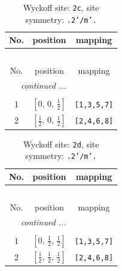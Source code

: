 \documentclass[fleqn,8pt]{jsarticle}
\begin{document}
\begin{longtable}{ccc}
\caption{Wyckoff site: {\tt 2c}, site symmetry: {\tt .2'/m'.}}
 \\
 \hline \hline
No. & position & mapping \\ \hline \endfirsthead

\multicolumn{2}{l}{\tablename\ \thetable{}} \\
 \hline \hline
No. & position & mapping \\ \hline \endhead

 \hline \hline
\multicolumn{2}{r}{\footnotesize\it continued ...} \\ \endfoot

 \hline \hline
\multicolumn{2}{r}{} \\ \endlastfoot

1 & $\left[ 0,\, 0,\, \frac{1}{2} \right]$ & {\tt [1,3,5,7]} \\ \hline
2 & $\left[ \frac{1}{2},\, 0,\, \frac{1}{2} \right]$ & {\tt [2,4,6,8]} \\
\end{longtable}
\renewcommand{\arraystretch}{1.2}
\begin{longtable}{ccc}
\caption{Wyckoff site: {\tt 2d}, site symmetry: {\tt .2'/m'.}}
 \\
 \hline \hline
No. & position & mapping \\ \hline \endfirsthead

\multicolumn{2}{l}{\tablename\ \thetable{}} \\
 \hline \hline
No. & position & mapping \\ \hline \endhead

 \hline \hline
\multicolumn{2}{r}{\footnotesize\it continued ...} \\ \endfoot

 \hline \hline
\multicolumn{2}{r}{} \\ \endlastfoot

1 & $\left[ 0,\, \frac{1}{2},\, \frac{1}{2} \right]$ & {\tt [1,3,5,7]} \\ \hline
2 & $\left[ \frac{1}{2},\, \frac{1}{2},\, \frac{1}{2} \right]$ & {\tt [2,4,6,8]} \\
\end{longtable}
\renewcommand{\arraystretch}{1.2}
\end{document}
